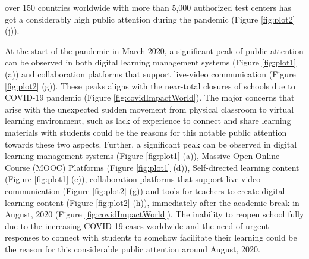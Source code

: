 \documentclass[11pt,a4paper,]{article}
\begin{document}
over 150 countries worldwide with more than 5,000 authorized test centers has got a considerably high public attention during the pandemic (Figure \ref{fig:plot2} (j)).

At the start of the pandemic in March 2020, a significant peak of public attention can be observed in both digital learning management systems (Figure \ref{fig:plot1} (a)) and collaboration platforms that support live-video communication (Figure \ref{fig:plot2} (g)). These peaks aligns with the near-total closures of schools due to COVID-19 pandemic (Figure \ref{fig:covidImpactWorld}). The major concerns that arise with the unexpected sudden movement from physical classroom to virtual learning environment, such as lack of experience to connect and share learning materials with students could be the reasons for this notable public attention towards these two aspects. Further, a significant peak can be observed in digital learning management systems (Figure \ref{fig:plot1} (a)), Massive Open Online Course (MOOC) Platforms (Figure \ref{fig:plot1} (d)), Self-directed learning content (Figure \ref{fig:plot1} (e)), collaboration platforms that support live-video communication (Figure \ref{fig:plot2} (g)) and tools for teachers to create digital learning content (Figure \ref{fig:plot2} (h)), immediately after the academic break in August, 2020 (Figure \ref{fig:covidImpactWorld}). The inability to reopen school fully due to the increasing COVID-19 cases worldwide and the need of urgent responses to connect with students to somehow facilitate their learning could be the reason for this considerable public attention around August, 2020.
\end{document}
